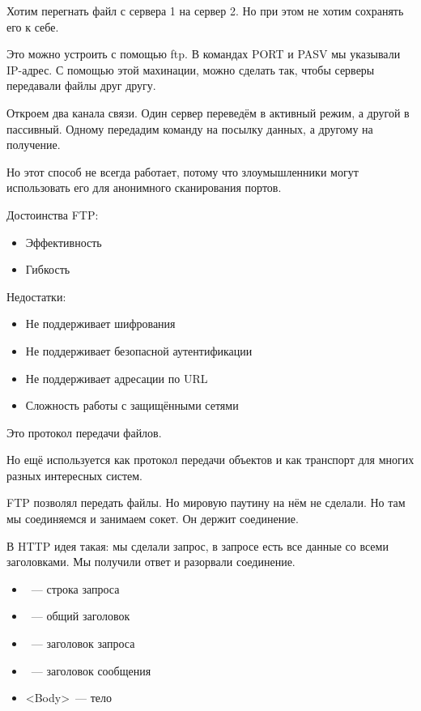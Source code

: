 Хотим перегнать файл с сервера 1 на сервер 2. Но при этом не хотим сохранять его к себе. 

Это можно устроить с помощью ftp. В командах PORT и PASV мы указывали IP-адрес. С помощью этой махинации, можно сделать так, чтобы серверы передавали файлы друг другу.

Откроем два канала связи. Один сервер переведём в активный режим, а другой в пассивный. Одному передадим команду на посылку данных, а другому на получение.

Но этот способ не всегда работает, потому что злоумышленники могут использовать его для анонимного сканирования портов.

Достоинства FTP:
\begin{itemize}
    \item Эффективность
    \item Гибкость
\end{itemize}

Недостатки:
\begin{itemize}
    \item Не поддерживает шифрования
    \item Не поддерживает безопасной аутентификации
    \item Не поддерживает адресации по URL
    \item Сложность работы с защищёнными сетями
\end{itemize}


Это протокол передачи файлов.

Но ещё используется как протокол передачи объектов и как транспорт для многих разных интересных систем.

FTP позволял передать файлы. Но мировую паутину на нём не сделали. Но там мы соединяемся и занимаем сокет. Он держит соединение. 

В HTTP идея такая: мы сделали запрос, в запросе есть все данные со всеми заголовками. Мы получили ответ и разорвали соединение.

\begin{itemize}
    \item <Request-line>~--- строка запроса
    \item <General-header>~--- общий заголовок
    \item <Request-header>~--- заголовок запроса
    \item <Entity-header>~--- заголовок сообщения
    \item <Body>~--- тело
\end{itemize}

